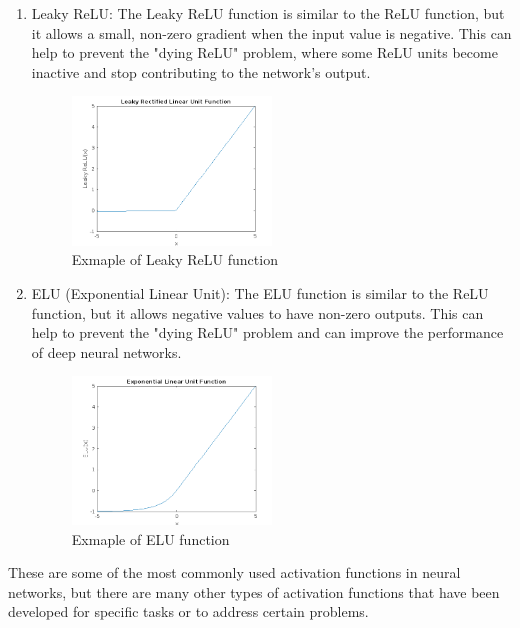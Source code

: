 \begin{enumerate}
        \item Leaky ReLU: The Leaky ReLU function is similar to the ReLU function, but it allows a small, non-zero gradient when the input
        value is negative. This can help to prevent the "dying ReLU" problem, where some ReLU units become inactive and stop
        contributing to the network's output.
        \begin{center}
            \begin{figure}[!ht]
                \centering
                \includegraphics[width=0.5\textwidth]{figures/leakyrelu}
                \caption{Exmaple of Leaky ReLU function}
                \label{fig:leakyrelu}
            \end{figure}
        \end{center}
        \item ELU (Exponential Linear Unit): The ELU function is similar to the ReLU function, but it allows negative values to have non-zero outputs.
        This can help to prevent the "dying ReLU" problem and can improve the performance of deep neural networks.
        \begin{center}
            \begin{figure}[!ht]
                \centering
                \includegraphics[width=0.5\textwidth]{figures/elu}
                \caption{Exmaple of ELU function}
                \label{fig:elu}
            \end{figure}
        \end{center}
    \end{enumerate}
    These are some of the most commonly used activation functions in neural networks, but there are many other types of activation
    functions that have been developed for specific tasks or to address certain problems.
    \newpage
